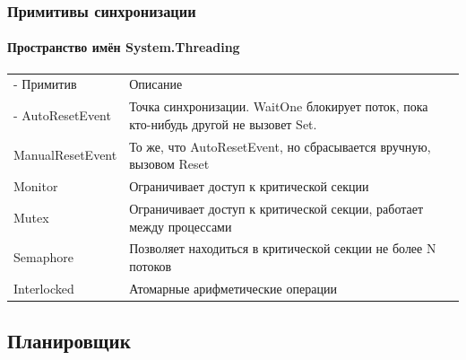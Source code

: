 \documentclass[xetex,mathserif,serif]{beamer}
\begin{document}
	\begin{frame}
		\frametitle{Примитивы синхронизации}
		\framesubtitle{Пространство имён System.Threading}
		\begin{footnotesize}
			\begin{tabu} {| X[0.3 l p] | X[1 l p] |}
				\tabucline-
				Примитив          & Описание           \\
				\tabucline-
				\everyrow{\tabucline-}
				AutoResetEvent    & Точка синхронизации. WaitOne блокирует поток, пока кто-нибудь другой не вызовет Set.  \\
				ManualResetEvent  & То же, что AutoResetEvent, но сбрасывается вручную, вызовом Reset                     \\
				Monitor           & Ограничивает доступ к критической секции                                              \\
				Mutex             & Ограничивает доступ к критической секции, работает между процессами                   \\
				Semaphore         & Позволяет находиться в критической секции не более N потоков                          \\
				Interlocked       & Атомарные арифметические операции                                                     \\
			\end{tabu}
		\end{footnotesize}
	\end{frame}

	\subsection{Планировщик}
\end{document}
